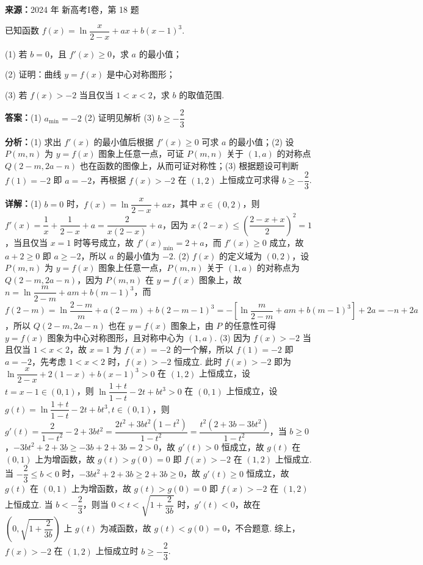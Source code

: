 \begin{question}[points=17]
\textbf{来源：}2024 年 新高考I卷，第 18 题\par
已知函数 $f(x)=\ln\dfrac{x}{2-x}+ax+b(x-1)^3$.

(1) 若 $b=0$，且 $f'(x)\ge 0$，求 $a$ 的最小值；

(2) 证明：曲线 $y=f(x)$ 是中心对称图形；

(3) 若 $f(x)>-2$ 当且仅当 $1<x<2$，求 $b$ 的取值范围.
\begin{solution}
\textbf{答案：}(1) $a_{\min}=-2$ (2) 证明见解析 (3) $b\ge -\dfrac{2}{3}$

\textbf{分析：}(1) 求出 $f'(x)$ 的最小值后根据 $f'(x)\ge 0$ 可求 $a$ 的最小值；(2) 设 $P(m,n)$ 为 $y=f(x)$ 图象上任意一点，可证 $P(m,n)$ 关于 $(1,a)$ 的对称点 $Q(2-m,2a-n)$ 也在函数的图像上，从而可证对称性；(3) 根据题设可判断 $f(1)=-2$ 即 $a=-2$，再根据 $f(x)>-2$ 在 $(1,2)$ 上恒成立可求得 $b\ge -\dfrac{2}{3}$.

\textbf{详解：}(1) $b=0$ 时，$f(x)=\ln\dfrac{x}{2-x}+ax$，其中 $x\in(0,2)$，则 $f'(x)=\dfrac{1}{x}+\dfrac{1}{2-x}+a=\dfrac{2}{x(2-x)}+a$，因为 $x(2-x)\le\left(\dfrac{2-x+x}{2}\right)^2=1$，当且仅当 $x=1$ 时等号成立，故 $f'(x)_{\min}=2+a$，而 $f'(x)\ge 0$ 成立，故 $a+2\ge 0$ 即 $a\ge -2$，所以 $a$ 的最小值为 $-2$.
(2) $f(x)$ 的定义域为 $(0,2)$，设 $P(m,n)$ 为 $y=f(x)$ 图象上任意一点，$P(m,n)$ 关于 $(1,a)$ 的对称点为 $Q(2-m,2a-n)$，因为 $P(m,n)$ 在 $y=f(x)$ 图象上，故 $n=\ln\dfrac{m}{2-m}+am+b(m-1)^3$，而 $f(2-m)=\ln\dfrac{2-m}{m}+a(2-m)+b(2-m-1)^3=-\left[\ln\dfrac{m}{2-m}+am+b(m-1)^3\right]+2a=-n+2a$，所以 $Q(2-m,2a-n)$ 也在 $y=f(x)$ 图象上，由 $P$ 的任意性可得 $y=f(x)$ 图象为中心对称图形，且对称中心为 $(1,a)$.
(3) 因为 $f(x)>-2$ 当且仅当 $1<x<2$，故 $x=1$ 为 $f(x)=-2$ 的一个解，所以 $f(1)=-2$ 即 $a=-2$，先考虑 $1<x<2$ 时，$f(x)>-2$ 恒成立. 此时 $f(x)>-2$ 即为 $\ln\dfrac{x}{2-x}+2(1-x)+b(x-1)^3>0$ 在 $(1,2)$ 上恒成立，设 $t=x-1\in(0,1)$，则 $\ln\dfrac{1+t}{1-t}-2t+bt^3>0$ 在 $(0,1)$ 上恒成立，设 $g(t)=\ln\dfrac{1+t}{1-t}-2t+bt^3, t\in(0,1)$，则 $g'(t)=\dfrac{2}{1-t^2}-2+3bt^2=\dfrac{2t^2+3bt^2(1-t^2)}{1-t^2}=\dfrac{t^2(2+3b-3bt^2)}{1-t^2}$，当 $b\ge 0$，$-3bt^2+2+3b\ge -3b+2+3b=2>0$，故 $g'(t)>0$ 恒成立，故 $g(t)$ 在 $(0,1)$ 上为增函数，故 $g(t)>g(0)=0$ 即 $f(x)>-2$ 在 $(1,2)$ 上恒成立. 当 $-\dfrac{2}{3}\le b<0$ 时，$-3bt^2+2+3b\ge 2+3b\ge 0$，故 $g'(t)\ge 0$ 恒成立，故 $g(t)$ 在 $(0,1)$ 上为增函数，故 $g(t)>g(0)=0$ 即 $f(x)>-2$ 在 $(1,2)$ 上恒成立. 当 $b<-\dfrac{2}{3}$，则当 $0<t<\sqrt{1+\dfrac{2}{3b}}$ 时，$g'(t)<0$，故在 $\left(0,\sqrt{1+\dfrac{2}{3b}}\right)$ 上 $g(t)$ 为减函数，故 $g(t)<g(0)=0$，不合题意. 综上，$f(x)>-2$ 在 $(1,2)$ 上恒成立时 $b\ge -\dfrac{2}{3}$.
\end{solution}
\end{question}

